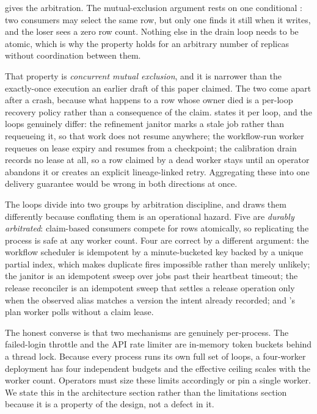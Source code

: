  gives the arbitration. The mutual-exclusion argument rests on
one conditional : two consumers may select the same row, but only one
finds it still  when it writes, and the loser sees a zero row count.
Nothing else in the drain loop needs to be atomic, which is why the property holds
for an arbitrary number of replicas without coordination between them.

That property is \emph{concurrent mutual exclusion}, and it is narrower than the
exactly-once execution an earlier draft of this paper claimed. The two come apart
after a crash, because what happens to a row whose owner died is a per-loop
recovery policy rather than a consequence of the claim.  states
it per loop, and the loops genuinely differ: the refinement janitor marks a stale
job  rather than requeueing it, so that work does not resume
anywhere; the workflow-run worker requeues on lease expiry and resumes from a
checkpoint; the calibration drain records no lease at all, so a row claimed by a
dead worker stays  until an operator abandons it or creates an
explicit lineage-linked retry. Aggregating these into one delivery
guarantee would be wrong in both directions at once.



The \statLoopsW{} loops divide into two groups by arbitration discipline, and
 draws them differently because conflating them is an
operational hazard. Five are \emph{durably arbitrated}: claim-based consumers
compete for rows atomically, so replicating the process is safe at any worker
count. Four are correct by a different argument: the workflow scheduler is
idempotent by a minute-bucketed key backed by a unique partial index, which makes
duplicate fires impossible rather than merely unlikely; the janitor is an
idempotent sweep over jobs past their heartbeat timeout; the release reconciler is
an idempotent sweep that settles a release operation only when the observed alias
matches a version the intent already recorded; and \aria{}'s plan worker polls
without a claim lease.

The honest converse is that two mechanisms are genuinely per-process. The
failed-login throttle and the API rate limiter are in-memory token buckets behind a
thread lock. Because every process runs its own full set of loops, a four-worker
deployment has four independent budgets and the effective ceiling scales with the
worker count. Operators must size these limits accordingly or pin a single worker.
We state this in the architecture section rather than the limitations section
because it is a property of the design, not a defect in it.


